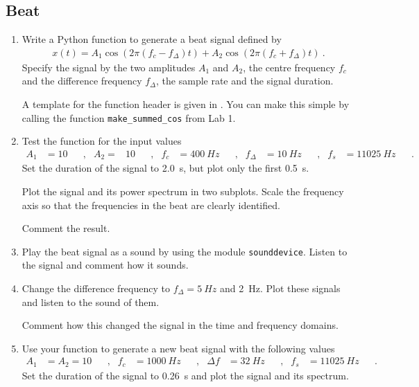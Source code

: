 \subsection{Beat}

\begin{enumerate}[1)]

\item Write a Python function to generate a beat signal defined by
	\begin{align}
		x(t) = A_1 \cos (2\pi(f_c-f_{\Delta})t ) + A_2 \cos (2\pi(f_c+f_{\Delta})t ) \:.
	\end{align}
	Specify the signal by the two amplitudes $A_1$ and $A_2$, the centre frequency $f_c$ and the difference frequency $f_{\Delta}$, the sample rate and the signal duration.
		
	A template for the function header is given in .		
	You can make this simple by calling the function \verb|make_summed_cos| from Lab 1.
	
		
		
\item Test the function for the input values
	\begin{align*}
		A_1 &= 10 & &, & A_2=&10 & &, & f_c&=\qty{400}{Hz} & &, & f_{\Delta}&=\qty{10}{Hz}
			& &, & f_s&=\qty{11025}{Hz} & &.
	\end{align*}
	Set the duration of the signal to \qty{2.0}{s}, but plot only the first \qty{0.5}{s}.
	
	Plot the signal and its power spectrum in two subplots. 
	Scale the frequency axis so that the frequencies in the beat are clearly identified.
	
	Comment the result.

\item Play the beat signal as a sound by using the module \verb|sounddevice|. 
	Listen to the signal and comment how it sounds.

\item Change the difference frequency to $f_{\Delta}=\qty{5}{Hz}$ and \qty{2}{Hz}.
	Plot these signals and listen to the sound of them.

	Comment how this changed the signal in the time and frequency domains. 

\item Use your function to generate a new beat signal with the following values
\begin{align*}
	A_1 &=  A_2=10 & &, & f_c&=\qty{1000}{Hz} & &, & \Delta f&=\qty{32}{Hz}
	& &, & f_s&=\qty{11025}{Hz} & &.
\end{align*}
Set the duration of the signal to \qty{0.26}{s} and plot the signal and its spectrum.


\end{enumerate}
